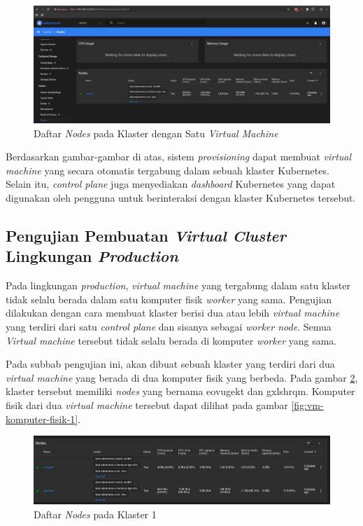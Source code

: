 \begin{figure}[H]
  \centering
  \includegraphics[scale=0.3]{gambar/kubernetes-dashboard-access-local-with-nodes.png}
  \caption{Daftar \emph{Nodes} pada Klaster dengan Satu \emph{Virtual Machine}}
  \label{fig:daftar-nodes-pada-dashboard-kubernetes}
\end{figure}

Berdasarkan gambar-gambar di atas, sistem \emph{provisioning} dapat membuat
\emph{virtual machine} yang secara otomatis tergabung dalam sebuah klaster Kubernetes.
Selain itu, \emph{control plane} juga menyediakan \emph{dashboard} Kubernetes yang dapat
digunakan oleh pengguna untuk berinteraksi dengan klaster Kubernetes tersebut.

\subsection{Pengujian Pembuatan \emph{Virtual Cluster} Lingkungan \emph{Production}}
\label{subsec:pengujian-pembuatan-vc-prod}

Pada lingkungan \emph{production}, \emph{virtual machine} yang tergabung dalam
satu klaster tidak selalu berada dalam satu komputer fisik \emph{worker} yang sama.
Pengujian dilakukan dengan cara membuat klaster berisi dua atau lebih \emph{virtual machine}
yang terdiri dari satu \emph{control plane} dan sisanya sebagai \emph{worker node}.
Semua \emph{Virtual machine} tersebut tidak selalu berada di komputer \emph{worker}
yang sama.

Pada subbab pengujian ini, akan dibuat sebuah klaster yang terdiri dari dua
\emph{virtual machine} yang berada di dua komputer fisik yang berbeda. Pada gambar
\ref{fig:nodes-2-komputer-berbeda-1}, klaster tersebut memiliki \emph{nodes} yang
bernama eovugekt dan gxlshrqm. Komputer fisik dari dua \emph{virtual machine}
tersebut dapat dilihat pada gambar \ref{fig:vm-komputer-fisik-1}.

\begin{figure}[H]
  \centering
  \includegraphics[scale=0.3]{gambar/two-nodes-difference-computer-dashboard.png}
  \caption{Daftar \emph{Nodes} pada Klaster 1}
  \label{fig:nodes-2-komputer-berbeda-1}
\end{figure}


